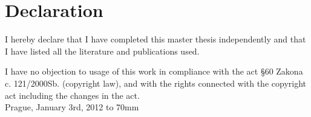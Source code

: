 \chapter*{Declaration}
\vspace*{\fill}
I hereby declare that I have completed this master thesis independently and that I have listed all the literature and publications used.

I have no objection to usage of this work in compliance with the act \S 60 
Zakona c. 121/2000Sb. (copyright law), and with the rights connected with the copyright act including the changes in the act.
\\[15mm]
Prague, January 3rd, 2012   \hfill \hbox to 70mm{\tiny\dotfill}
\cleardoublepage%